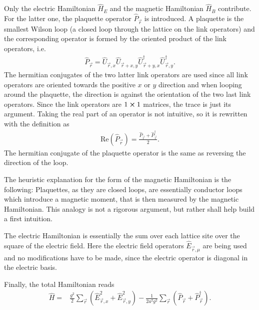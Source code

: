 Only the electric Hamiltonian $\hat{H}_E$ and the magnetic Hamiltonian $\hat{H}_B$ contribute. For the latter one, the plaquette operator $\hat{P}_{\vec{r}}$ is introduced. A plaquette is the smallest Wilson loop (a closed loop through the lattice on the link operators) and the corresponding operator is formed by the oriented product of the link operators, i.e.
\begin{align}
	\hat{P}_{\vec{r}}=\hat{U}_{\vec{r}, x}\hat{U}_{\vec{r}+x,y}\hat{U}^{\dag}_{\vec{r}+y,x}\hat{U}^{\dag}_{\vec{r},y}.
\end{align}
The hermitian conjugates of the two latter link operators are used since all link operators are oriented towards the positive $x$ or $y$ direction and when looping around the plaquette, the direction is against the orientation of the two last link operators. Since the link operators are $1\cross1$ matrices, the trace is just its argument. Taking the real part of an operator is not intuitive, so it is rewritten with the definition as 
\begin{align}
  \text{Re}(\hat{P}_{\vec{r}})=\frac{\hat{P}_{\vec{r}}+\hat{P}_{\vec{r}}^{\dag}}{2}.
\end{align}
The hermitian conjugate of the plaquette operator is the same as reversing the direction of the loop.

The heuristic explanation for the form of the magnetic Hamiltonian is the following: Plaquettes, as they are closed loops, are essentially conductor loops which introduce a magnetic moment, that is then measured by the magnetic Hamiltonian. This analogy is not a rigorous argument, but rather shall help build a first intuition.

The electric Hamiltonian is essentially the sum over each lattice site over the square of the electric field. Here the electric field operators $\hat{E}_{\vec{r},\mu}$ are being used and no modifications have to be made, since the electric operator is diagonal in the electric basis.

Finally, the total Hamiltonian reads
\begin{align*}
  \hat{H} = & \frac{g^2}{2}\sum_{\vec{r}}\left(\hat{E}_{\vec{r}, x}^2+\hat{E}_{\vec{r}, y}^2\right)-\frac{1}{2a^2g^2}\sum_{\vec{r}}\left(\hat{P}_{\vec{r}}+\hat{P}_{\vec{r}}^{\dag}\right).
\end{align*}
  
